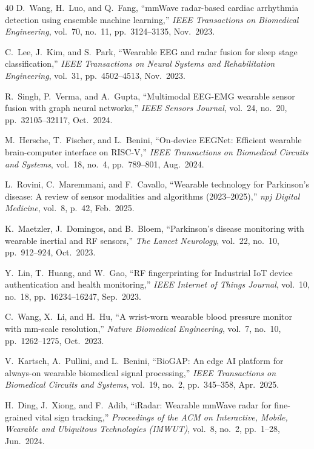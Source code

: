 \documentclass[journal,twoside]{IEEEtran}
\begin{document}
\begin{thebibliography}{40}
D.~Wang, H.~Luo, and Q.~Fang, ``mmWave radar-based cardiac arrhythmia detection using ensemble machine learning,'' \emph{IEEE Transactions on Biomedical Engineering}, vol.~70, no.~11, pp.~3124--3135, Nov.\ 2023.

C.~Lee, J.~Kim, and S.~Park, ``Wearable EEG and radar fusion for sleep stage classification,'' \emph{IEEE Transactions on Neural Systems and Rehabilitation Engineering}, vol.~31, pp.~4502--4513, Nov.\ 2023.

R.~Singh, P.~Verma, and A.~Gupta, ``Multimodal EEG-EMG wearable sensor fusion with graph neural networks,'' \emph{IEEE Sensors Journal}, vol.~24, no.~20, pp.~32105--32117, Oct.\ 2024.

M.~Hersche, T.~Fischer, and L.~Benini, ``On-device EEGNet: Efficient wearable brain-computer interface on RISC-V,'' \emph{IEEE Transactions on Biomedical Circuits and Systems}, vol.~18, no.~4, pp.~789--801, Aug.\ 2024.

L.~Rovini, C.~Maremmani, and F.~Cavallo, ``Wearable technology for Parkinson's disease: A review of sensor modalities and algorithms (2023--2025),'' \emph{npj Digital Medicine}, vol.~8, p.~42, Feb.\ 2025.

K.~Maetzler, J.~Domingos, and B.~Bloem, ``Parkinson's disease monitoring with wearable inertial and RF sensors,'' \emph{The Lancet Neurology}, vol.~22, no.~10, pp.~912--924, Oct.\ 2023.

Y.~Lin, T.~Huang, and W.~Gao, ``RF fingerprinting for Industrial IoT device authentication and health monitoring,'' \emph{IEEE Internet of Things Journal}, vol.~10, no.~18, pp.~16234--16247, Sep.\ 2023.

C.~Wang, X.~Li, and H.~Hu, ``A wrist-worn wearable blood pressure monitor with mm-scale resolution,'' \emph{Nature Biomedical Engineering}, vol.~7, no.~10, pp.~1262--1275, Oct.\ 2023.

V.~Kartsch, A.~Pullini, and L.~Benini, ``BioGAP: An edge AI platform for always-on wearable biomedical signal processing,'' \emph{IEEE Transactions on Biomedical Circuits and Systems}, vol.~19, no.~2, pp.~345--358, Apr.\ 2025.

H.~Ding, J.~Xiong, and F.~Adib, ``iRadar: Wearable mmWave radar for fine-grained vital sign tracking,'' \emph{Proceedings of the ACM on Interactive, Mobile, Wearable and Ubiquitous Technologies (IMWUT)}, vol.~8, no.~2, pp.~1--28, Jun.\ 2024.


\end{thebibliography}
\end{document}
